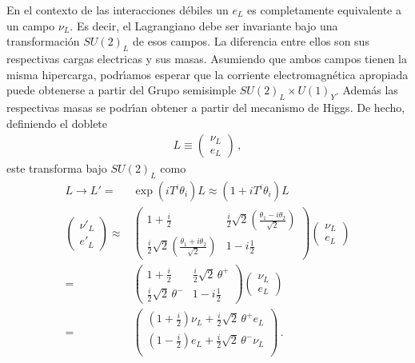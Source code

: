 En el contexto de las interacciones d\'ebiles un $e_L$ es completamente equivalente a un campo $\nu_L$. Es decir, el Lagrangiano debe ser invariante bajo una transformaci\'on $SU(2)_L$ de esos campos. La diferencia entre ellos son sus respectivas cargas electricas y sus masas. Asumiendo que ambos campos tienen la misma hipercarga, podr\'\i amos esperar que la corriente electromagn\'etica apropiada puede obtenerse a partir del Grupo semisimple $SU(2)_L\times U(1)_Y$. Adem\'as las respectivas masas se podr\'\i an obtener a partir del mecanismo de Higgs. De hecho, definiendo el doblete 
  \begin{align}
    L\equiv\begin{pmatrix}
      \nu_L\\
      e_L      
    \end{pmatrix}\,,
  \end{align}
este transforma bajo $SU(2)_L$ como
\begin{align}
  L\to L'=&\exp(i T^i \theta_i)L\approx(1+i T^i\theta_i)L\nonumber\\
  \begin{pmatrix}
    \nu'_L\\
    e'_L
  \end{pmatrix}\approx&\begin{pmatrix}
    1+\frac{i}{2}&\frac{i}{2}\sqrt{2}\left(\frac{\theta_1-i\theta_2}{\sqrt{2}}\right)\\
    \frac{i}{2}\sqrt{2}\left(\frac{\theta_1+i\theta_2}{\sqrt{2}}\right)&1-i\frac{1}{2}
  \end{pmatrix}\begin{pmatrix}
    \nu_L\\
    e_L
  \end{pmatrix}\nonumber\\
  =&\begin{pmatrix}
    1+\frac{i}{2}&\frac{i}{2}\sqrt{2}\,\theta^+\\
    \frac{i}{2}\sqrt{2}\,\theta^-&1-i\frac{1}{2}
  \end{pmatrix}\begin{pmatrix}
    \nu_L\\
    e_L
  \end{pmatrix}\nonumber\\
  =&\begin{pmatrix}
    \left(1+\frac{i}{2}\right)\nu_L+\frac{i}{2}\sqrt{2}\,\theta^+e_L\\
    \left(1-\frac{i}{2}\right)e_L+\frac{i}{2}\sqrt{2}\,\theta^-\nu_L\\
  \end{pmatrix}\,.
\end{align}
